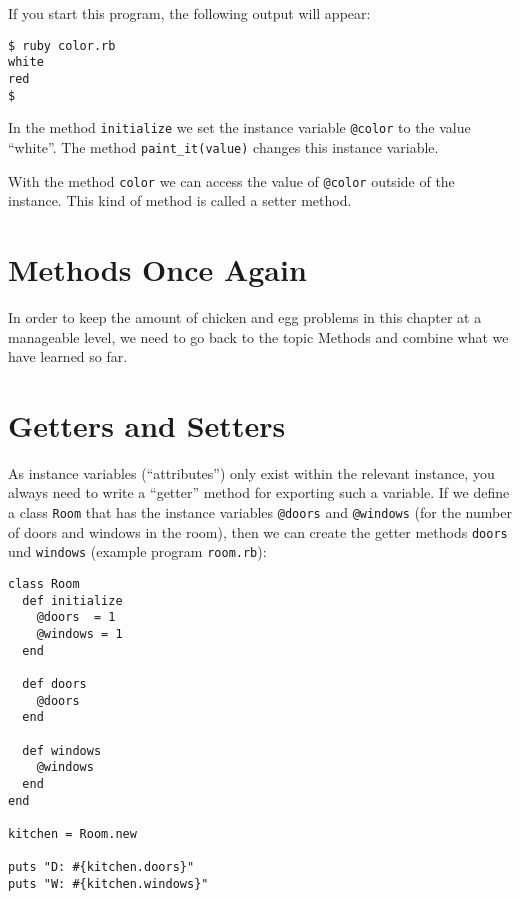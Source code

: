 \documentclass[a4paper]{book}
\begin{document}
If you start this program, the following output will appear:

\begin{shaded}\begin{verbatim}
$ ruby color.rb
white
red
$
\end{verbatim}\end{shaded}

In the method \texttt{initialize} we set the instance variable \texttt{@color} to the value “white”. The method \texttt{paint\_it(value)} changes this instance variable.

With the method \texttt{color} we can access the value of \texttt{@color} outside of the instance. This kind of method is called a setter method.

\section{Methods Once Again}\label{methods-once-again}

In order to keep the amount of chicken and egg problems in this chapter at a manageable level, we need to go back to the topic Methods and combine what we have learned so far.

\section{Getters and Setters}\label{getters-and-setters}

As instance variables (“attributes”) only exist within the relevant instance, you always need to write a “getter” method for exporting such a variable. If we define a class \texttt{Room} that has the instance variables \texttt{@doors} and \texttt{@windows} (for the number of doors and windows in the room), then we can create the getter methods \texttt{doors} und \texttt{windows} (example program \texttt{room.rb}):

\begin{shaded}\begin{verbatim}
class Room
  def initialize
    @doors  = 1
    @windows = 1
  end

  def doors
    @doors
  end

  def windows
    @windows
  end
end

kitchen = Room.new

puts "D: #{kitchen.doors}"
puts "W: #{kitchen.windows}"
\end{verbatim}\end{shaded}
\end{document}
